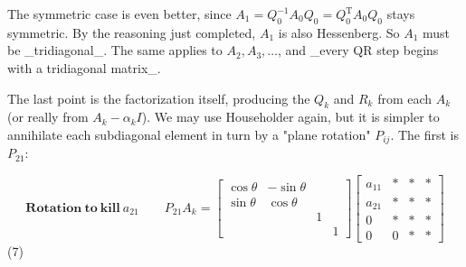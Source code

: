 The symmetric case is even better, since \(A_{1}=Q_{0}^{-1}A_{0}Q_{0}=Q_{0}^{\mathrm{T}}A_{0}Q_{0}\) stays symmetric. By the reasoning just completed, \(A_{1}\) is also Hessenberg. So \(A_{1}\) must be _tridiagonal_. The same applies to \(A_{2},A_{3},\ldots\), and _every QR step begins with a tridiagonal matrix_.

The last point is the factorization itself, producing the \(Q_{k}\) and \(R_{k}\) from each \(A_{k}\) (or really from \(A_{k}-\alpha_{k}I\)). We may use Householder again, but it is simpler to annihilate each subdiagonal element in turn by a "plane rotation" \(P_{ij}\). The first is \(P_{21}\):

\[\mathbf{Rotation\ to\ kill}\ a_{21}\qquad P_{21}A_{k}=\begin{bmatrix}\cos\theta&- \sin\theta\\ \sin\theta&\cos\theta\\ &&1\\ &&&1\end{bmatrix}\begin{bmatrix}a_{11}&\ast&\ast&\ast\\ a_{21}&\ast&\ast&\ast\\ 0&\ast&\ast&\ast\\ 0&0&\ast&\ast\end{bmatrix}\] (7) 